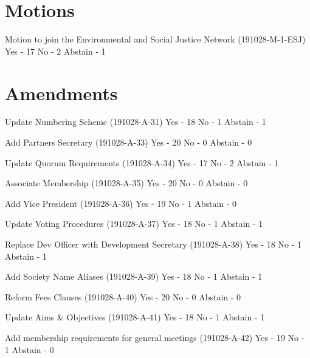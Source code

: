 \documentclass[11pt,hacksoc]{meetingmins}
\begin{document}
\maketitle

\section{Motions}
\begin{items}
  \item Motion to join the Environmental and Social Justice Network (191028-M-1-ESJ)
    \subitem Yes - 17
    \subitem No - 2
    \subitem Abstain - 1
  
\end{items}

\section{Amendments}
\begin{items}
  \item Update Numbering Scheme (191028-A-31)
    \subitem Yes - 18
    \subitem No - 1
    \subitem Abstain - 1

  \item Add Partners Secretary (191028-A-33)
    \subitem Yes - 20
    \subitem No - 0
    \subitem Abstain - 0

  \item Update Quorum Requirements (191028-A-34)
    \subitem Yes - 17
    \subitem No - 2
    \subitem Abstain - 1

  \item Associate Membership (191028-A-35)
    \subitem Yes - 20
    \subitem No - 0
    \subitem Abstain - 0

  \item Add Vice President (191028-A-36)
    \subitem Yes - 19
    \subitem No - 1
    \subitem Abstain - 0

  \item Update Voting Procedures (191028-A-37)
    \subitem Yes - 18
    \subitem No - 1
    \subitem Abstain - 1

  \item Replace Dev Officer with Development Secretary (191028-A-38)
    \subitem Yes - 18
    \subitem No - 1
    \subitem Abstain - 1

  \item Add Society Name Aliases (191028-A-39)
    \subitem Yes - 18
    \subitem No - 1
    \subitem Abstain - 1

  \item Reform Fees Clauses (191028-A-40)
    \subitem Yes - 20
    \subitem No - 0
    \subitem Abstain - 0

  \item Update Aims \& Objectives (191028-A-41)
    \subitem Yes - 18
    \subitem No - 1
    \subitem Abstain - 1

  \item Add membership requirements for general meetings (191028-A-42)
    \subitem Yes - 19
    \subitem No - 1
    \subitem Abstain - 0
\end{items}
\end{document}
